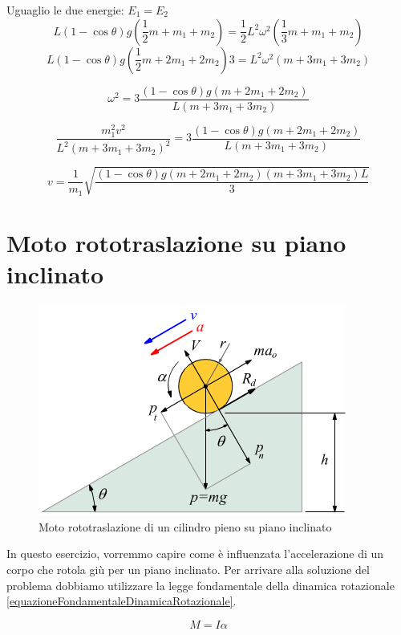 Uguaglio le due energie: $E_1 = E_2$
\begin{equation*} 
    L(1-\cos\theta)g(\frac{1}{2}m+m_1+m_2) = \frac{1}{2}L^2\omega^2(\frac{1}{3}m+m_1+m_2)
\end{equation*}
\begin{equation*} 
    L(1-\cos\theta)g(\frac{1}{2}m+2m_1+2m_2)3 = L^2\omega^2(m+3m_1+3m_2)
\end{equation*}

\begin{equation*} 
    \omega^2= 3\frac{(1-\cos\theta)g(m+2m_1+2m_2)}{L(m+3m_1+3m_2)}
\end{equation*}

\begin{equation*} 
    \frac{m_1^2v^2}{L^2(m+3m_1+3m_2)^2}= 3\frac{(1-\cos\theta)g(m+2m_1+2m_2)}{L(m+3m_1+3m_2)}
\end{equation*}

\begin{equation} 
    v = \frac{1}{m_1}\sqrt{\frac{(1-\cos\theta)g(m+2m_1+2m_2)(m+3m_1+3m_2)L}{3}}
\end{equation}


\section{Moto rototraslazione su piano inclinato}
\begin{figure}[H]
    \centering
    \includegraphics[width = 0.45 \textwidth]{image/motoRototraslatorioPianoIncl.png}
    \caption{Moto rototraslazione di un cilindro pieno su piano inclinato }
    \label{fig:motoRotoTras}
\end{figure}

In questo esercizio, vorremmo capire come è influenzata l'accelerazione di un corpo che rotola giù per un piano inclinato.
Per arrivare alla soluzione del problema dobbiamo utilizzare la legge fondamentale della dinamica rotazionale \ref{equazioneFondamentaleDinamicaRotazionale}.

\begin{equation*}
    M = I\alpha
\end{equation*}

